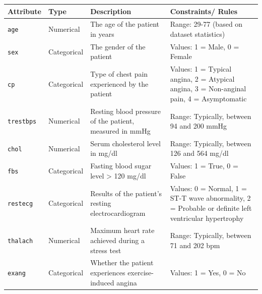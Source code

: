 \documentclass[
]{article}
\begin{document}
\begin{longtable}[]{@{}
  >{\raggedright\arraybackslash}p{}
  >{\raggedright\arraybackslash}p{}
  >{\raggedright\arraybackslash}p{}
  >{\raggedright\arraybackslash}p{}@{}}
\toprule\noalign{}
\begin{minipage}[b]{\linewidth}\raggedright
Attribute
\end{minipage} & \begin{minipage}[b]{\linewidth}\raggedright
Type
\end{minipage} & \begin{minipage}[b]{\linewidth}\raggedright
Description
\end{minipage} & \begin{minipage}[b]{\linewidth}\raggedright
Constraints/ Rules
\end{minipage} \\
\midrule\noalign{}
\endhead
\bottomrule\noalign{}
\endlastfoot
\texttt{age} & Numerical & The age of the patient in years & Range:
29-77 (based on dataset statistics) \\
\texttt{sex} & Categorical & The gender of the patient & Values: 1 =
Male, 0 = Female \\
\texttt{cp} & Categorical & Type of chest pain experienced by the
patient & Values: 1 = Typical angina, 2 = Atypical angina, 3 =
Non-anginal pain, 4 = Asymptomatic \\
\texttt{trestbps} & Numerical & Resting blood pressure of the patient,
measured in mmHg & Range: Typically, between 94 and 200 mmHg \\
\texttt{chol} & Numerical & Serum cholesterol level in mg/dl & Range:
Typically, between 126 and 564 mg/dl \\
\texttt{fbs} & Categorical & Fasting blood sugar level \textgreater{}
120 mg/dl & Values: 1 = True, 0 = False \\
\texttt{restecg} & Categorical & Results of the patient's resting
electrocardiogram & Values: 0 = Normal, 1 = ST-T wave abnormality, 2 =
Probable or definite left ventricular hypertrophy \\
\texttt{thalach} & Numerical & Maximum heart rate achieved during a
stress test & Range: Typically, between 71 and 202 bpm \\
\texttt{exang} & Categorical & Whether the patient experiences
exercise-induced angina & Values: 1 = Yes, 0 = No \\

\end{longtable}
\end{document}
